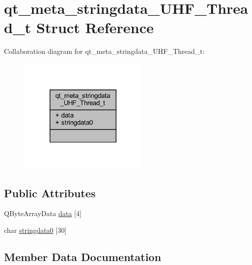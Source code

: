 \hypertarget{structqt__meta__stringdata___u_h_f___thread__t}{}\section{qt\+\_\+meta\+\_\+stringdata\+\_\+\+U\+H\+F\+\_\+\+Thread\+\_\+t Struct Reference}
\label{structqt__meta__stringdata___u_h_f___thread__t}


Collaboration diagram for qt\+\_\+meta\+\_\+stringdata\+\_\+\+U\+H\+F\+\_\+\+Thread\+\_\+t\+:
\nopagebreak
\begin{figure}[H]
\begin{center}
\leavevmode
\includegraphics[width=180pt]{structqt__meta__stringdata___u_h_f___thread__t__coll__graph}
\end{center}
\end{figure}
\subsection*{Public Attributes}
\begin{DoxyCompactItemize}
\item 
Q\+Byte\+Array\+Data \mbox{\hyperlink{structqt__meta__stringdata___u_h_f___thread__t_a79455fb5f4097d5d14c9b1d5a99e8bb3}{data}} \mbox{[}4\mbox{]}
\item 
char \mbox{\hyperlink{structqt__meta__stringdata___u_h_f___thread__t_a65803f48c35456c264a6760f689b9b8e}{stringdata0}} \mbox{[}30\mbox{]}
\end{DoxyCompactItemize}


\subsection{Member Data Documentation}
\mbox{\label{structqt__meta__stringdata___u_h_f___thread__t_a79455fb5f4097d5d14c9b1d5a99e8bb3}} 
